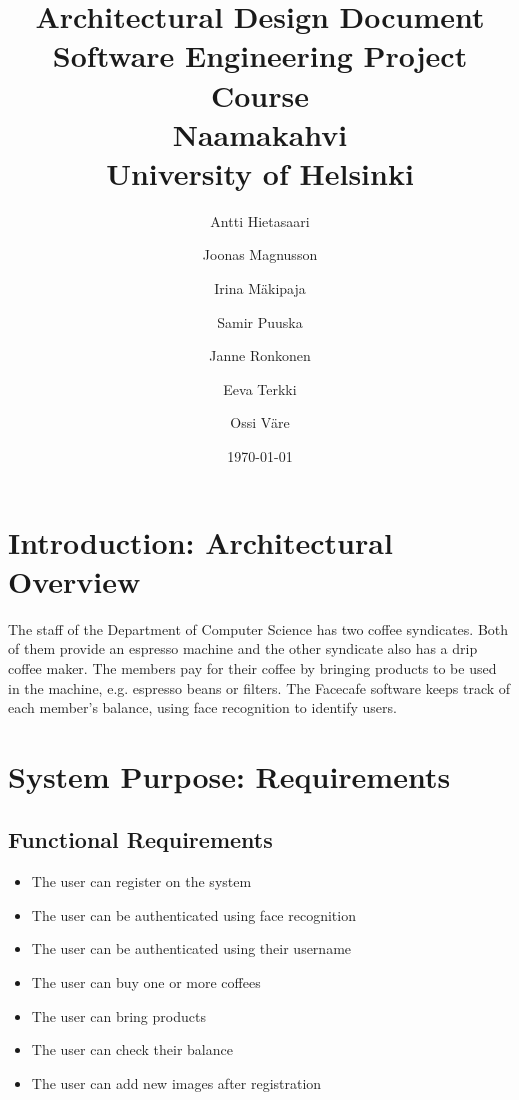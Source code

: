 \documentclass[11pt]{article}
\title{Architectural Design Document\\
  Software Engineering Project Course\\
  Naamakahvi\\
  University of Helsinki}
\author{Antti Hietasaari
  \and Joonas Magnusson
  \and Irina Mäkipaja
  \and Samir Puuska
  \and Janne Ronkonen
  \and Eeva Terkki
  \and Ossi Väre}
\date{\today}
\begin{document}
\maketitle

\tableofcontents



\section{Introduction: Architectural Overview}

The staff of the Department of Computer Science has two coffee syndicates. Both of them provide an espresso machine and the other syndicate also has a drip coffee maker. The members pay for their coffee by bringing products to be used in the machine, e.g. espresso beans or filters. The Facecafe software keeps track of each member’s balance, using face recognition to identify users.

\section{System Purpose: Requirements}


\subsection{Functional Requirements}

\begin{itemize}
\item{The user can register on the system}
\item{The user can be authenticated using face recognition}
\item{The user can be authenticated using their username}  
\item{The user can buy one or more coffees}
\item{The user can bring products}
\item{The user can check their balance}
\item{The user can add new images after registration}
\end{itemize}  
\end{document}
